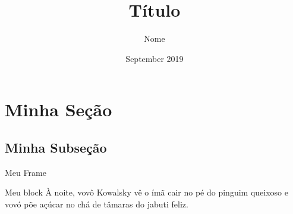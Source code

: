 \documentclass{beamer}
\title{Título}
\author{Nome}
\date{September 2019}
\begin{document}
\maketitle

\section{Minha Seção}

\subsection{Minha Subseção}

\begin{frame}{Meu Frame}

    \begin{block}{Meu block}
        À noite, vovô Kowalsky vê o ímã cair no pé do pinguim queixoso e vovó põe açúcar no chá de tâmaras do jabuti feliz.
    \end{block}

\end{frame}
\end{document}
